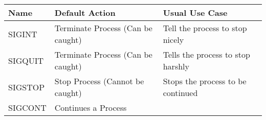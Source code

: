 \begin{longtable}[c]{@{}lll@{}}
\toprule
\begin{minipage}[b]{0.12\columnwidth}\raggedright\strut
Name
\strut\end{minipage} &
\begin{minipage}[b]{0.44\columnwidth}\raggedright\strut
Default Action
\strut\end{minipage} &
\begin{minipage}[b]{0.35\columnwidth}\raggedright\strut
Usual Use Case
\strut\end{minipage}\tabularnewline
\midrule
\endhead
\begin{minipage}[t]{0.12\columnwidth}\raggedright\strut
SIGINT
\strut\end{minipage} &
\begin{minipage}[t]{0.44\columnwidth}\raggedright\strut
Terminate Process (Can be caught)
\strut\end{minipage} &
\begin{minipage}[t]{0.35\columnwidth}\raggedright\strut
Tell the process to stop nicely
\strut\end{minipage}\tabularnewline
\begin{minipage}[t]{0.12\columnwidth}\raggedright\strut
SIGQUIT
\strut\end{minipage} &
\begin{minipage}[t]{0.44\columnwidth}\raggedright\strut
Terminate Process (Can be caught)
\strut\end{minipage} &
\begin{minipage}[t]{0.35\columnwidth}\raggedright\strut
Tells the process to stop harshly
\strut\end{minipage}\tabularnewline
\begin{minipage}[t]{0.12\columnwidth}\raggedright\strut
SIGSTOP
\strut\end{minipage} &
\begin{minipage}[t]{0.44\columnwidth}\raggedright\strut
Stop Process (Cannot be caught)
\strut\end{minipage} &
\begin{minipage}[t]{0.35\columnwidth}\raggedright\strut
Stops the process to be continued
\strut\end{minipage}\tabularnewline
\begin{minipage}[t]{0.12\columnwidth}\raggedright\strut
SIGCONT
\strut\end{minipage} &
\begin{minipage}[t]{0.44\columnwidth}\raggedright\strut
Continues a Process

\end{minipage}
\end{longtable}
